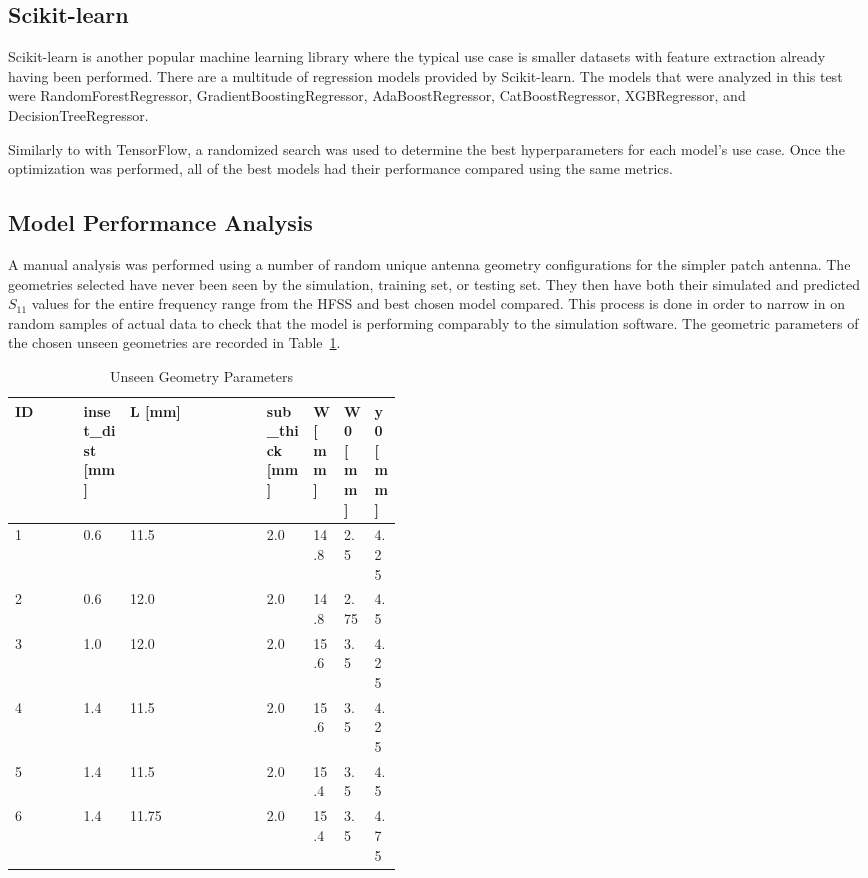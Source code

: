 \documentclass[lettersize,journal]{IEEEtran}
\begin{document}
\subsection{Scikit-learn}
Scikit-learn is another popular machine learning library where the typical use case is smaller datasets with feature extraction already having been performed. There are a multitude of regression models provided by Scikit-learn. The models that were analyzed in this test were RandomForestRegressor, GradientBoostingRegressor, AdaBoostRegressor, CatBoostRegressor, XGBRegressor, and DecisionTreeRegressor.

Similarly to with TensorFlow, a randomized search was used to determine the best hyperparameters for each model's use case. Once the optimization was performed, all of the best models had their performance compared using the same metrics. 

\subsection{Model Performance Analysis}
A manual analysis was performed using a number of random unique antenna geometry configurations for the simpler patch antenna. The geometries selected have never been seen by the simulation, training set, or testing set. They then have both their simulated and predicted $S_{11}$ values for the entire frequency range from the HFSS and best chosen model compared. This process is done in order to narrow in on random samples of actual data to check that the model is performing comparably to the simulation software. The geometric parameters of the chosen unseen geometries are recorded in Table~\ref{unseen_geometries}.

\begin{table}[h]
\caption{Unseen Geometry Parameters}
\begin{center}
\begin{tabular}{ |l|p{0.12\linewidth}|l|p{0.12\linewidth}|p{0.07\linewidth}|p{0.07\linewidth}|p{0.07\linewidth}| }
    \hline
    ID & inset\_dist [mm] & L [mm] & sub\_thick [mm] & W [mm] & W0 [mm] & y0 [mm] \\ 
    \hline
    1 & 0.6 & 11.5 & 2.0 & 14.8 & 2.5 & 4.25 \\
    \hline
    2 & 0.6 & 12.0 & 2.0 & 14.8 & 2.75 & 4.5 \\
    \hline
    3 & 1.0 & 12.0 & 2.0 & 15.6 & 3.5 & 4.25 \\
    \hline
    4 & 1.4 & 11.5 & 2.0 & 15.6 & 3.5 & 4.25 \\
    \hline
    5 & 1.4 & 11.5 & 2.0 & 15.4 & 3.5 & 4.5 \\
    \hline
    6 & 1.4 & 11.75 & 2.0 & 15.4 & 3.5 & 4.75 \\
    \hline
\end{tabular}
\end{center}
\label{unseen_geometries}
\end{table}    
\end{document}
